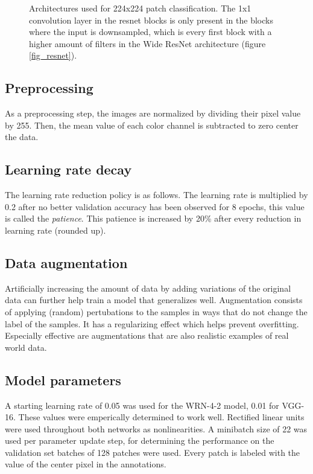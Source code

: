 \documentclass[journal]{IEEEtran}
\begin{document}
\begin{figure}[!t]
{\label{fig_vgg}}
\caption{Architectures used for 224x224 patch classification. The 1x1 convolution layer in the resnet blocks is only present in the blocks where the input is downsampled, which is every first block with a higher amount of filters in the Wide ResNet architecture (figure \ref{fig_resnet}).}
\label{fig_architectures}
\end{figure}




\subsection{Preprocessing}
As a preprocessing step, the images are normalized by dividing their pixel value by 255. Then, the mean value of each color channel is subtracted to zero center the data.

\subsection{Learning rate decay}
The learning rate reduction policy is as follows. The learning rate is multiplied by 0.2 after no better validation accuracy has been observed for 8 epochs, this value is called the \emph{patience}. This patience is increased by 20\% after every reduction in learning rate (rounded up).  

\subsection{Data augmentation}
Artificially increasing the amount of data by adding variations of the original data can further help train a model that generalizes well. Augmentation consists of applying (random) pertubations to the samples in ways that do not change the label of the samples. It has a regularizing effect which helps prevent overfitting. Especially effective are augmentations that are also realistic examples of real world data.

\subsection{Model parameters}
A starting learning rate of 0.05 was used for the WRN-4-2 model, 0.01 for VGG-16. These values were emperically determined to work well. Rectified linear units were used throughout both networks as nonlinearities. A minibatch size of 22 was used per parameter update step, for determining the performance on the validation set batches of 128 patches were used. Every patch is labeled with the value of the center pixel in the annotations. 
\end{document}
